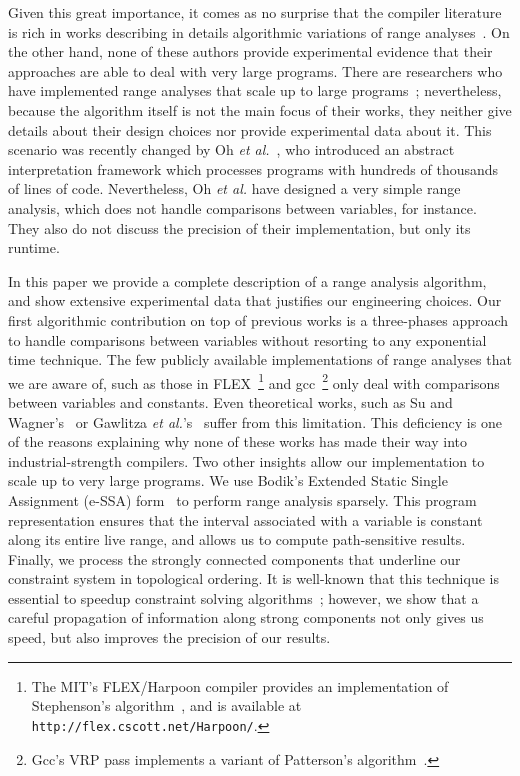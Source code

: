 \documentclass{llncs}
\begin{document}
Given this great importance, it comes as no surprise that the compiler
literature is rich in works describing in details algorithmic variations of
range analyses~\cite{Gawlitza09,Mahlke01,Stephenson00,Su05}.
On the other hand, none of these authors provide experimental evidence that
their approaches are able to deal with very large programs.
There are researchers who have implemented range analyses that scale up to
large programs~\cite{Blanchet03,Venet04}; nevertheless, because the
algorithm itself is not the main focus of their works, they neither give
details about their design choices nor provide experimental data about it.
This scenario was recently changed by Oh {\em et al.}~\cite{Oh12}, who
introduced an abstract interpretation framework which processes programs with
hundreds of thousands of lines of code.
Nevertheless, Oh {\em et al.} have designed a very simple range analysis,
which does not handle comparisons between variables, for instance.
They also do not discuss the precision of their implementation, but only its
runtime.

In this paper we provide a complete description of a range analysis algorithm,
and show extensive experimental data that justifies our engineering choices.
Our first algorithmic contribution on top of previous works is a three-phases
approach to handle comparisons between variables without resorting to any
exponential time technique.
The few publicly available implementations of range analyses that we are
aware of, such as those in FLEX~\footnote{The MIT's FLEX/Harpoon compiler
provides an implementation of Stephenson's algorithm~\cite{Stephenson00}, and
is available at \texttt{http://flex.cscott.net/Harpoon/}.} and
gcc~\footnote{Gcc's VRP pass implements a variant of Patterson's
algorithm~\cite{Patterson95}.} only deal with comparisons between variables and
constants.
Even theoretical works, such as Su and Wagner's~\cite{Su05} or Gawlitza
{\em et al.}'s~\cite{Gawlitza09} suffer from this limitation.
This deficiency is one of the reasons explaining why none of these works has
made their way into industrial-strength compilers.
Two other insights allow our implementation to scale up to very large
programs.
We use Bodik's Extended Static Single Assignment (e-SSA) form~\cite{Bodik00} to
perform range analysis sparsely.
This program representation ensures that the interval associated with
a variable is constant along its entire live range, and allows us to compute
path-sensitive results.
Finally, we process the strongly connected components that underline our
constraint system in topological ordering.
It is well-known that this technique is essential to speedup constraint solving
algorithms~\cite[Sec 6.3]{Nielson99}; however, we show that a careful
propagation of information along strong components not only gives us speed, but
also improves the precision of our results.
\end{document}

